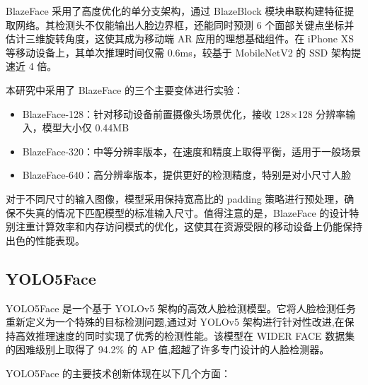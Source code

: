 \documentclass{article}
\begin{document}
BlazeFace 采用了高度优化的单分支架构，通过 BlazeBlock 模块串联构建特征提取网络。其检测头不仅能输出人脸边界框，还能同时预测 6 个面部关键点坐标并估计三维旋转角度，这使其成为移动端 AR 应用的理想基础组件。在 iPhone XS 等移动设备上，其单次推理时间仅需 0.6ms，较基于 MobileNetV2 的 SSD 架构提速近 4 倍。

本研究中采用了 BlazeFace 的三个主要变体进行实验：
\begin{itemize}
    \item BlazeFace-128：针对移动设备前置摄像头场景优化，接收 128$\times$128 分辨率输入，模型大小仅 0.44MB
    \item BlazeFace-320：中等分辨率版本，在速度和精度上取得平衡，适用于一般场景
    \item BlazeFace-640：高分辨率版本，提供更好的检测精度，特别是对小尺寸人脸
\end{itemize}

对于不同尺寸的输入图像，模型采用保持宽高比的 padding 策略进行预处理，确保不失真的情况下匹配模型的标准输入尺寸。值得注意的是，BlazeFace 的设计特别注重计算效率和内存访问模式的优化，这使其在资源受限的移动设备上仍能保持出色的性能表现。

\subsection{YOLO5Face}
YOLO5Face\cite{qi2022yolo5face} 是一个基于 YOLOv5 架构的高效人脸检测模型。它将人脸检测任务重新定义为一个特殊的目标检测问题,通过对 YOLOv5 架构进行针对性改进,在保持高效推理速度的同时实现了优秀的检测性能。该模型在 WIDER FACE 数据集的困难级别上取得了 94.2\% 的 AP 值,超越了许多专门设计的人脸检测器。

YOLO5Face 的主要技术创新体现在以下几个方面：
\end{document}
